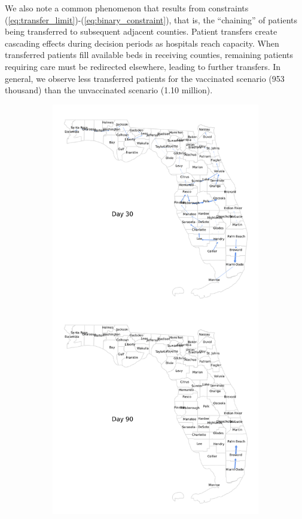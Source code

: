 \documentclass{article}
\begin{document}
We also note a common phenomenon that results from constraints (\ref{eq:transfer_limit})-(\ref{eq:binary_constraint}), that is, the ``chaining'' of patients being transferred to subsequent adjacent counties. Patient transfers create cascading effects during decision periods as hospitals reach capacity. When transferred patients fill available beds in receiving counties, remaining patients requiring care must be redirected elsewhere, leading to further transfers. In general, we observe less transferred patients for the vaccinated scenario (953 thousand) than the unvaccinated scenario (1.10 million).

\begin{figure}
    \centering
    \begin{subfigure}{0.445\linewidth}
        \centering
        \includegraphics[width=\linewidth]{pics/paperStackedPatientTransfersVax0.1.png}

\end{subfigure}
\end{figure}
\end{document}
